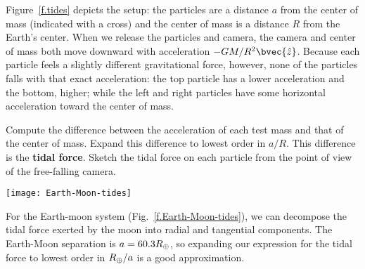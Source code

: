 Figure~\ref{f.tides} depicts the setup: the particles are a distance $a$ from the center of mass (indicated with a cross) and the center of mass is a distance $R$ from the Earth's center.
When we release the particles and camera, the camera and center of mass both move downward with acceleration $-GM/R^{2}\bvec{\hat{z}}$.  Because each particle feels a slightly different gravitational force, however, none of the particles falls with that exact acceleration: the top particle has a lower acceleration and the bottom, higher; while the left and right particles have some horizontal acceleration 
toward the center of mass.

\begin{exercisebox}
\label{ex:simple-tidal}
Compute the difference between the acceleration of each test mass and that of the center of mass.  Expand this difference to lowest order in $a/R$.  This difference is the \textbf{tidal force}.  Sketch the tidal force on each particle from the point of view of the free-falling camera.
\end{exercisebox}

\begin{figure*}[hbtp]
\texttt{[image: Earth-Moon-tides]}
\caption[Tidal force on the Earth]{Schematic of the tidal force on the Earth raised by the Moon.
\label{f.Earth-Moon-tides}}
\end{figure*}

For the Earth-moon system (Fig.~\ref{f.Earth-Moon-tides}), we can decompose the tidal force exerted by the moon into radial and tangential components.  The Earth-Moon separation is $a = 60.3 R_{\oplus}$, so expanding our expression for the tidal force to lowest order in $R_{\oplus}/a$ is a good approximation.

